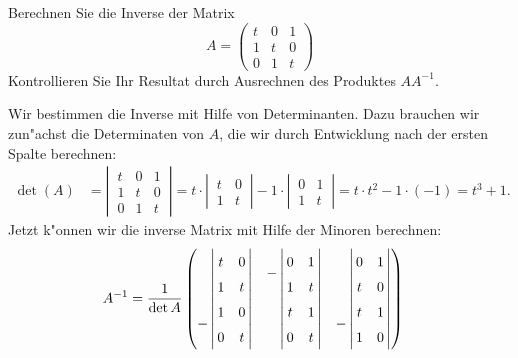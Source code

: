 Berechnen Sie die Inverse der Matrix
\[
A
=
\begin{pmatrix}
t&0&1\\
1&t&0\\
0&1&t
\end{pmatrix}
\]
Kontrollieren Sie Ihr Resultat durch Ausrechnen des Produktes $AA^{-1}$.

\begin{loesung}
Wir bestimmen die Inverse mit Hilfe von Determinanten.
Dazu brauchen wir zun"achst die Determinaten von $A$, die wir durch Entwicklung
nach der ersten Spalte berechnen:
\begin{align*}
\det(A)
&=
\left|\,\begin{matrix}
t&0&1\\
1&t&0\\
0&1&t
\end{matrix}\,\right|
=
t\cdot\left|\,\begin{matrix}t&0\\1&t\end{matrix}\,\right|
-1\cdot\left|\,\begin{matrix}0&1\\1&t\end{matrix}\,\right|
=
t\cdot t^2-1\cdot(-1)=t^3+1.
\end{align*}
Jetzt k"onnen wir die inverse Matrix mit Hilfe der Minoren berechnen:
\begin{align}
A^{-1}
&=
\renewcommand*{\arraystretch}{1.5}
\frac1{\det{A}}\begin{pmatrix}
\phantom{-}\left|\,\begin{matrix}t&0\\1&t\end{matrix}\,\right|
	&-\left|\,\begin{matrix}0&1\\1&t\end{matrix}\,\right|
		&\phantom{-}\left|\,\begin{matrix}0&1\\t&0\end{matrix}\,\right|\\
-\left|\,\begin{matrix}1&0\\0&t\end{matrix}\,\right|
	&\phantom{-}\left|\,\begin{matrix}t&1\\0&t\end{matrix}\,\right|
		&-\left|\,\begin{matrix}t&1\\1&0\end{matrix}\,\right|\\

\end{pmatrix}
\end{align}
\end{loesung}
